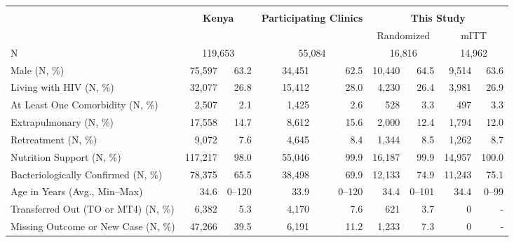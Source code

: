 \scriptsize{
\begin{tabular}{lrr|rr|rr|rr}
\hline \hline & & & & & & & & \\[-8pt]
\rowcolor{yellow!15}
& \multicolumn{2}{c|}{\textbf{Kenya}} & \multicolumn{2}{c|}{\textbf{Participating Clinics}} & \multicolumn{4}{c}{\textbf{This Study}} \\
\rowcolor{yellow!15}
& \multicolumn{2}{c|}{} & \multicolumn{2}{c|}{} & \multicolumn{2}{c|}{Randomized} & \multicolumn{2}{c}{mITT} \\
\hline
N & \multicolumn{2}{c|}{119,653} & \multicolumn{2}{c|}{55,084} & \multicolumn{2}{c|}{16,816} & \multicolumn{2}{c}{14,962} \\
Male (N, \%) & 75,597 & 63.2 & 34,451 & 62.5 & 10,440 & 64.5 & 9,514 & 63.6 \\
Living with HIV (N, \%) & 32,077 & 26.8 & 15,412 & 28.0 & 4,230 & 26.4 & 3,981 & 26.9 \\
At Least One Comorbidity (N, \%) & 2,507 & 2.1 & 1,425 & 2.6 & 528 & 3.3 & 497 & 3.3 \\
Extrapulmonary (N, \%) & 17,558 & 14.7 & 8,612 & 15.6 & 2,000 & 12.4 & 1,794 & 12.0 \\
Retreatment (N, \%) & 9,072 & 7.6 & 4,645 & 8.4 & 1,344 & 8.5 & 1,262 & 8.7 \\
Nutrition Support (N, \%) & 117,217 & 98.0 & 55,046 & 99.9 & 16,187 & 99.9 & 14,957 & 100.0 \\
Bacteriologically Confirmed (N, \%) & 78,375 & 65.5 & 38,498 & 69.9 & 12,133 & 74.9 & 11,243 & 75.1 \\
Age in Years (Avg., Min--Max) & 34.6 & 0--120 & 33.9 & 0--120 & 34.4 & 0--101 & 34.4 & 0--99 \\
\hline
Transferred Out (TO or MT4) (N, \%) & 6,382 & 5.3 & 4,170 & 7.6 & 621 & 3.7 & 0 & - \\
Missing Outcome or New Case (N, \%) & 47,266 & 39.5 & 6,191 & 11.2 & 1,233 & 7.3 & 0 & - \\
\hline \hline
\end{tabular}
}